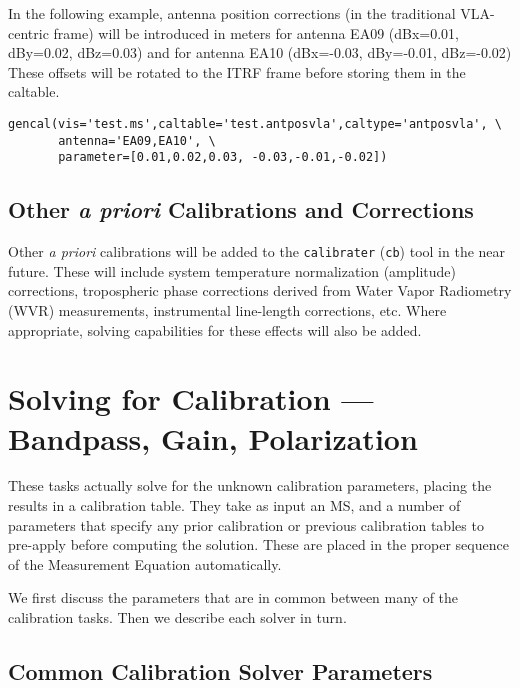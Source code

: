 In the following example, antenna position corrections (in the
traditional VLA-centric frame) will be introduced in meters for
antenna EA09 (dBx=0.01, dBy=0.02, dBz=0.03) and for antenna EA10
(dBx=-0.03, dBy=-0.01, dBz=-0.02) These offsets will be rotated to the
ITRF frame before storing them in the caltable.

\small
\begin{verbatim}
gencal(vis='test.ms',caltable='test.antposvla',caltype='antposvla', \
       antenna='EA09,EA10', \
       parameter=[0.01,0.02,0.03, -0.03,-0.01,-0.02])
\end{verbatim}
\normalsize



\subsection{Other {\it a priori} Calibrations and Corrections}
\label{section:cal.prior.other}

Other {\it a priori} calibrations will be added to the 
{\tt calibrater} ({\tt cb}) tool 
in the near future.  These will include
system temperature normalization (amplitude) corrections,
tropospheric phase corrections derived from Water Vapor Radiometry
(WVR) measurements, instrumental line-length corrections, etc.  Where
appropriate, solving capabilities for these effects will also be
added.

\section{Solving for Calibration --- Bandpass, Gain, Polarization}
\label{section:cal.solve}

These tasks actually solve for the unknown calibration parameters,
placing the results in a calibration table.  They take as input
an MS, and a number of parameters that specify any prior calibration
or previous calibration tables to pre-apply before computing the
solution.  These are placed in the proper sequence of the Measurement
Equation automatically.

We first discuss the parameters that are in common between many
of the calibration tasks.  Then we describe each solver in turn.

\subsection{Common Calibration Solver Parameters}
\label{section:cal.solve.pars}

